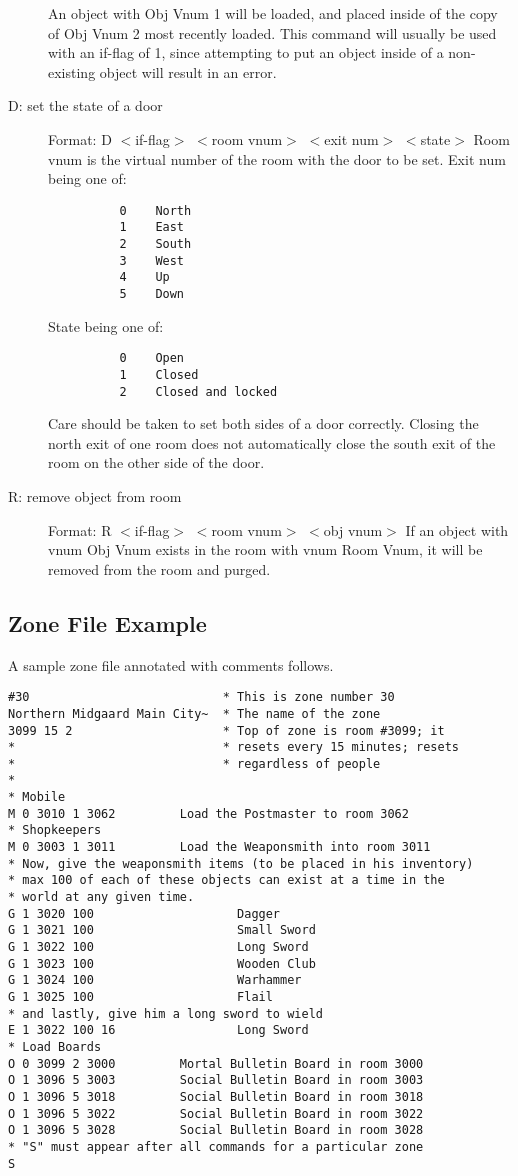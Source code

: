 \documentclass[11pt]{article}
\begin{document}
\begin{description}
An object with Obj Vnum 1 will be loaded, and placed inside of the copy of Obj Vnum 2 most recently loaded.\newline
This command will usually be used with an if-flag of 1, since attempting to put an object inside of a non-existing object will result in an error.
\item[D: set the state of a door] Format: D $<$if-flag$>$ $<$room vnum$>$ $<$exit num$>$ $<$state$>$\newline
Room vnum is the virtual number of the room with the door to be set. Exit num being one of:
\begin{verbatim}
          0    North
          1    East
          2    South
          3    West
          4    Up
          5    Down 
\end{verbatim}
State being one of:
\begin{verbatim}
          0    Open
          1    Closed
          2    Closed and locked
\end{verbatim}
Care should be taken to set both sides of a door correctly.  Closing the north exit of one room does not automatically close the south exit of the room on the other side of the door.
\item[R: remove object from room] Format: R $<$if-flag$>$ $<$room vnum$>$ $<$obj vnum$>$\newline
If an object with vnum Obj Vnum exists in the room with vnum Room Vnum, it will be removed from the room and purged.
\end{description}

\subsection{Zone File Example}
A sample zone file annotated with comments follows.
\begin{verbatim}
#30                           * This is zone number 30
Northern Midgaard Main City~  * The name of the zone
3099 15 2                     * Top of zone is room #3099; it
*                             * resets every 15 minutes; resets
*                             * regardless of people
*
* Mobile
M 0 3010 1 3062         Load the Postmaster to room 3062
* Shopkeepers
M 0 3003 1 3011         Load the Weaponsmith into room 3011
* Now, give the weaponsmith items (to be placed in his inventory)
* max 100 of each of these objects can exist at a time in the
* world at any given time.
G 1 3020 100                    Dagger
G 1 3021 100                    Small Sword
G 1 3022 100                    Long Sword
G 1 3023 100                    Wooden Club
G 1 3024 100                    Warhammer
G 1 3025 100                    Flail
* and lastly, give him a long sword to wield
E 1 3022 100 16                 Long Sword
* Load Boards
O 0 3099 2 3000         Mortal Bulletin Board in room 3000
O 1 3096 5 3003         Social Bulletin Board in room 3003
O 1 3096 5 3018         Social Bulletin Board in room 3018
O 1 3096 5 3022         Social Bulletin Board in room 3022
O 1 3096 5 3028         Social Bulletin Board in room 3028
* "S" must appear after all commands for a particular zone
S
\end{verbatim}
\end{document}
